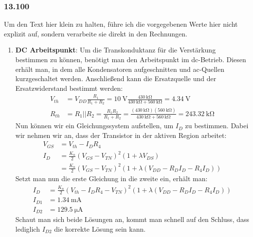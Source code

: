 \documentclass[11pt,a4paper,titlepage]{article}
\begin{document}
\subsubsection*{13.100}
Um den Text hier klein zu halten, führe ich die vorgegebenen Werte hier nicht explizit auf, sondern verarbeite sie direkt in den Rechnungen.\\
\begin{enumerate}
	\item \textbf{DC Arbeitspunkt}: Um die Transkonduktanz für die Verstärkung bestimmen zu können, benötigt man den Arbeitspunkt im dc-Betrieb. Diesen erhält man, in dem alle Kondensatoren aufgeschnitten  und ac-Quellen kurzgeschaltet werden. Anschließend kann die Ersatzquelle und der Ersatzwiderstand bestimmt werden:
	\begin{equation}
	\begin{aligned}
	  V_{th} &= V_{DD}\frac{R_1}{R_1+R_2} = \SI{10}{\volt} \frac{\SI{430}{\kilo\ohm}}{\SI{430}{\kilo\ohm} + \SI{560}{\kilo\ohm}} = \SI{4.34}{\volt}\\
	  R_{th} &= R_1 || R_2 = \frac{R_1R_2}{R_1+R_2} = \frac{(\SI{430}{\kilo\ohm})(\SI{560}{\kilo\ohm})}{\SI{430}{\kilo\ohm}+\SI{560}{\kilo\ohm}} = \SI{243.32}{\kilo\ohm}
	\end{aligned}
	\end{equation}
	Nun können wir ein Gleichungssystem aufstellen, um $I_D$ zu bestimmen. Dabei wir nehmen wir an, dass der Transistor in der aktiven Region arbeitet:
	\begin{equation}
	\begin{aligned}
	V_{GS} &= V_{th} - I_DR_4 \\
	I_D &= \frac{K_n}{2}(V_{GS}-V_{TN})^2(1+\lambda V_{DS}) \\
	    &= \frac{K_n}{2}(V_{GS}-V_{TN})^2(1+\lambda (V_{DD}-R_DI_D-R_4I_D))
	\end{aligned}
	\end{equation}
	Setzt man nun die erste Gleichung in die zweite ein, erhält man:
	\begin{equation}
	\begin{aligned}
	I_D &= \frac{K_n}{2}(V_{th} - I_DR_4-V_{TN})^2(1+\lambda (V_{DD}-R_DI_D-R_4I_D))\\
	I_{D1} &= \SI{1.34}{\milli\ampere}\\
	I_{D2} &= \SI{129.5}{\micro\ampere}
	\end{aligned}
	\end{equation}
	Schaut man sich beide Lösungen an, kommt man schnell auf den Schluss, dass lediglich $I_{D2}$ die korrekte Lösung sein kann.
	

\end{enumerate}
\end{document}

